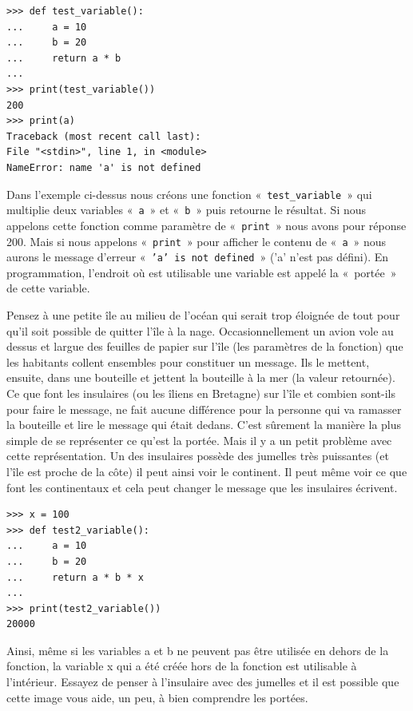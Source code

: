 \begin{Verbatim}[frame=single,rulecolor=\color{red}, label=erreur]
>>> def test_variable():
...     a = 10
...     b = 20
...     return a * b
...
>>> print(test_variable())
200
>>> print(a)
Traceback (most recent call last):
File "<stdin>", line 1, in <module>
NameError: name 'a' is not defined
\end{Verbatim}

Dans l'exemple ci-dessus nous créons une fonction «~\texttt{test\_variable}~» qui multiplie deux variables «~\texttt{a}~» et «~\texttt{b}~» puis retourne le résultat. Si nous appelons cette fonction comme paramètre de «~\texttt{print}~»  nous avons pour réponse 200. Mais si nous appelons «~\texttt{print}~» pour afficher le contenu de «~\texttt{a}~» nous aurons  le message d'erreur «~\texttt{'a' is not defined}~» ('a' n'est pas défini). En programmation, l'endroit où est utilisable une variable est appelé la «~portée~» de cette variable.

Pensez à une petite île au milieu de l'océan qui serait trop éloignée de tout pour qu'il soit possible de quitter l'île à la nage. Occasionnellement un avion vole au dessus et largue des feuilles de papier sur l'île (les paramètres de la fonction) que les habitants collent ensembles pour constituer un message. Ils le mettent, ensuite, dans une bouteille et jettent la bouteille à la mer (la valeur retournée). Ce que font les insulaires (ou les îliens en Bretagne) sur l'île et combien sont-ils pour faire le message, ne fait aucune différence pour la personne qui va ramasser la bouteille et lire le message qui était dedans. C'est sûrement la manière la plus simple de se représenter ce qu'est la portée. Mais il y a un petit problème avec cette représentation. Un des insulaires possède des jumelles très puissantes (et l'île est proche de la côte) il peut ainsi voir le continent. Il peut même voir ce que font les continentaux et cela peut changer le message que les insulaires écrivent.

 \begin{Verbatim}[frame=single,rulecolor=\color{mbleu}, label=à taper]
>>> x = 100
>>> def test2_variable():
...     a = 10
...     b = 20
...     return a * b * x
...
>>> print(test2_variable())
20000
\end{Verbatim}

Ainsi, même si les variables a et b ne peuvent pas être utilisée en dehors de la fonction, la variable x qui a été créée hors de la fonction est utilisable à l'intérieur. Essayez de penser à l'insulaire avec des jumelles et il est possible que cette image vous aide, un peu, à bien comprendre les portées. 

